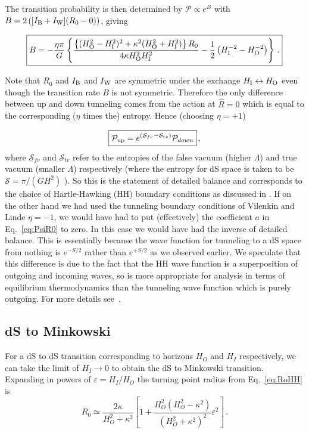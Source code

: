 \documentclass[a4paper,11pt]{article}
\numberwithin{equation}{section}
\newcommand{\be}{\begin{equation}}
\newcommand{\ee}{\end{equation}}
\def\S{\mathcal S}
\numberwithin{equation}{section}
\begin{document}
The transition probability is then  determined by ${\mathcal P}\propto e^B$ with $B=2\left([I_{\rm B}+ I_{\rm W}](R_0-0)\right)$, giving

\be
\boxed{
B  =-\frac{\eta\pi}{G}\left\{ \frac{\left\{ (H_{{\rm O}}^{2}-H_{{\rm I}}^{2})^{2}+\kappa^{2}(H_{{\rm O}}^{2}+H_{{\rm I}}^{2})\right\} R_{{0}}}{4\kappa H_{{\rm O}}^{2}H_{{\rm I}}^{2}}-\frac{1}{2}\left(H_{{\rm I}}^{-2}-H_{{\rm O}}^{-2}\right)\right\} \, . } \label{eq:ItpdSdS}
\ee

Note that  $R_0$ and $I_{{\rm B}}$ and $I_{{\rm W}}$  are symmetric under the exchange $H_{\rm I}\leftrightarrow H_{\rm O}$ even though the transition rate $B$ is not symmetric. Therefore the only difference between up and down tunneling comes from the action at $\hat R=0$ which is equal to the corresponding ($\eta$ times the) entropy. Hence (choosing $\eta =+1$)

\be
\boxed{{\mathcal P}_{{\rm up}}=e^{\left(\S_{fv}-\S_{tv}\right)}{\mathcal P}_{down}} \,,\label{eq:updown}
\ee
where $\S_{fv}$ and $\S_{tv}$ refer to the entropies of the false vacuum (higher $\Lambda$) and true vacuum (smaller $\Lambda$) respectively (where the entropy for dS space is taken to be $\S=\pi/(GH^2)$ ).  So this is the statement of detailed balance and corresponds to the choice of Hartle-Hawking (HH) boundary conditions as discussed in \cite{DeAlwis:2019rxg}.
 If on the other hand we
had used the tunneling boundary conditions of Vilenkin and Linde $\eta=-1$,
we would have had to put (effectively) the coefficient $a$ in  Eq.~\eqref{eq:PsiR0} 
to zero. In this case we would have had the inverse
of detailed balance. This is
essentially because the wave function for tunneling to a
dS space from nothing is $e^{-S/2}$ rather than $e^{+S/2}$ as we
observed earlier. We speculate that this difference is due to the
fact that the HH wave function is a superposition of outgoing and incoming
waves, so is more appropriate for analysis in terms of equilibrium
thermodynamics than the tunneling wave function which is purely outgoing. For more details see~\cite{DeAlwis:2019rxg}.

\subsection*{dS to Minkowski}
For a dS to dS transition corresponding to horizons   $H_O$ and $H_I$ respectively, we can take the limit of $H_I\rightarrow 0$ to obtain the dS to Minkowski transition. Expanding in powers of 
$\varepsilon=H_I/H_O$ the turning point radius from Eq.~\eqref{eq:RoHH} is
\be
R_0\simeq \frac{2\kappa}{H_O^2+\kappa^2}\left[1+\frac{H_O^2\left(H_O^2-\kappa^2\right)}{\left(H_O^2+\kappa^2\right)^2}\varepsilon^2 \right] \,.
\ee 
\end{document}
